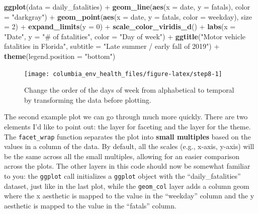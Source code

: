 \documentclass[]{tufte-book}
\newenvironment{Shaded}{}{}
\newcommand{\DataTypeTok}[1]{\textcolor[rgb]{0.56,0.13,0.00}{#1}}
\newcommand{\DecValTok}[1]{\textcolor[rgb]{0.25,0.63,0.44}{#1}}
\newcommand{\KeywordTok}[1]{\textcolor[rgb]{0.00,0.44,0.13}{\textbf{#1}}}
\newcommand{\NormalTok}[1]{#1}
\newcommand{\OperatorTok}[1]{\textcolor[rgb]{0.40,0.40,0.40}{#1}}
\newcommand{\StringTok}[1]{\textcolor[rgb]{0.25,0.44,0.63}{#1}}
\begin{document}
\begin{Shaded}
\begin{Highlighting}[]
\KeywordTok{ggplot}\NormalTok{(}\DataTypeTok{data =}\NormalTok{ daily_fatalities) }\OperatorTok{+}\StringTok{ }\KeywordTok{geom_line}\NormalTok{(}\KeywordTok{aes}\NormalTok{(}\DataTypeTok{x =}\NormalTok{ date, }
    \DataTypeTok{y =}\NormalTok{ fatals), }\DataTypeTok{color =} \StringTok{"darkgray"}\NormalTok{) }\OperatorTok{+}\StringTok{ }\KeywordTok{geom_point}\NormalTok{(}\KeywordTok{aes}\NormalTok{(}\DataTypeTok{x =}\NormalTok{ date, }
    \DataTypeTok{y =}\NormalTok{ fatals, }\DataTypeTok{color =}\NormalTok{ weekday), }\DataTypeTok{size =} \DecValTok{2}\NormalTok{) }\OperatorTok{+}\StringTok{ }
\StringTok{    }\KeywordTok{expand_limits}\NormalTok{(}\DataTypeTok{y =} \DecValTok{0}\NormalTok{) }\OperatorTok{+}\StringTok{ }\KeywordTok{scale_color_viridis_d}\NormalTok{() }\OperatorTok{+}\StringTok{ }
\StringTok{    }\KeywordTok{labs}\NormalTok{(}\DataTypeTok{x =} \StringTok{"Date"}\NormalTok{, }\DataTypeTok{y =} \StringTok{"# of fatalities"}\NormalTok{, }\DataTypeTok{color =} \StringTok{"Day of week"}\NormalTok{) }\OperatorTok{+}\StringTok{ }
\StringTok{    }\KeywordTok{ggtitle}\NormalTok{(}\StringTok{"Motor vehicle fatalities in Florida"}\NormalTok{, }
        \DataTypeTok{subtitle =} \StringTok{"Late summer / early fall of 2019"}\NormalTok{) }\OperatorTok{+}\StringTok{ }
\StringTok{    }\KeywordTok{theme}\NormalTok{(}\DataTypeTok{legend.position =} \StringTok{"bottom"}\NormalTok{)}
\end{Highlighting}
\end{Shaded}

\begin{figure}
\texttt{[image: columbia\_env\_health\_files/figure-latex/step8-1]} \caption[Change the order of the days of week from alphabetical to temporal by transforming the data before plotting]{Change the order of the days of week from alphabetical to temporal by transforming the data before plotting.}\label{fig:step8}
\end{figure}

The second example plot we can go through much more quickly. There are two
elements I'd like to point out: the layer for faceting and the layer for the theme.
The \texttt{facet\_wrap} function separates the plot into \textbf{small multiples}
based on the values in a column of the data. By default, all the scales (e.g., x-axis,
y-axis) will be the same across all the small multiples, allowing for an easier
comparison across the plots. The other layers in this code should now be somewhat
familiar to you: the \texttt{ggplot} call initializes a \texttt{ggplot} object with the
``daily\_fatalities'' dataset, just like in the last plot, while the \texttt{geom\_col} layer
adds a column geom where the x aesthetic is mapped to the value in the ``weekday''
column and the y aesthetic is mapped to the value in the ``fatals'' column.
\end{document}
